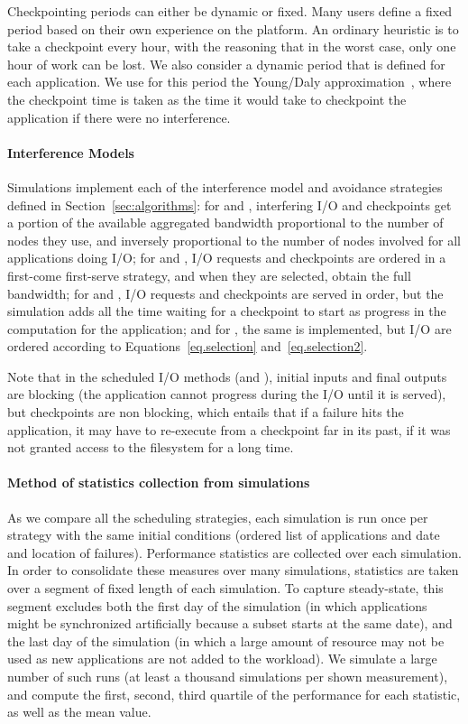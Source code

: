 Checkpointing periods can either be dynamic or fixed. Many users
define a fixed period based on their own experience on the
platform. An ordinary heuristic is to take a checkpoint every hour,
with the reasoning that in the worst case, only one hour of work can
be lost. We also consider a dynamic period that is defined for each
application. We use for this period the Young/Daly
approximation~\cite{young74,daly04}, where the checkpoint time is
taken as the time it would take to checkpoint the application if there
were no interference.

\paragraph*{Interference Models} Simulations implement each of the
interference model and avoidance strategies defined in
Section~\ref{sec:algorithms}: for \propfixed and \propdaly,
interfering I/O and checkpoints get a portion of the available
aggregated bandwidth proportional to the number of nodes they use, and
inversely proportional to the number of nodes involved for all
applications doing I/O; for \bfifofixed and \bfifodaly, I/O requests
and checkpoints are ordered in a first-come first-serve strategy, and
when they are selected, obtain the full bandwidth; for \fifofixed and
\fifodaly, I/O requests and checkpoints are served in order, but the
simulation adds all the time waiting for a checkpoint to start as
progress in the computation for the application; and for \cooperative,
the same is implemented, but I/O are ordered according to
Equations~\ref{eq.selection} and~\ref{eq.selection2}.

Note that in the scheduled I/O methods (\fifononblock and \cooperative),
initial inputs and final outputs are blocking (the application
cannot progress during the I/O until it is served), but checkpoints
are non blocking, which entails that if a failure hits the application,
it may have to re-execute from a checkpoint far in its past, if it was not
granted access to the filesystem for a long time.

\paragraph*{Method of statistics collection from simulations}
As we compare all the scheduling strategies, each simulation is run
once per strategy with the same initial conditions (ordered list of
applications and date and location of failures). Performance
statistics are collected over each simulation. In order to consolidate
these measures over many simulations, statistics are taken over a
segment of fixed length of each simulation.  To capture steady-state,
this segment excludes both
the first day of the simulation (in which applications might be
synchronized artificially because a subset starts at the same date),
and the last day of the simulation (in which a large amount of
resource may not be used as new applications are not added to the
workload). We simulate a large number of such runs (at least a
thousand simulations per shown measurement), and compute the first,
second, third quartile of the performance for each statistic, as well
as the mean value.
